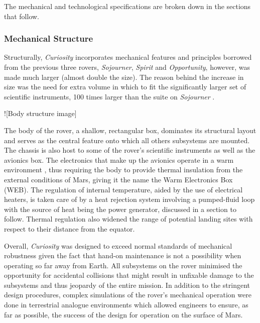       The mechanical and technological specifications are broken down in the sections that follow.
      
      \subsubsection{Mechanical Structure}
        Structurally, \textit{Curiosity} incorporates mechanical features and principles borrowed from the previous three rovers, \textit{Sojourner}, \textit{Spirit} and \textit{Opportunity}, however, was made much larger (almost double the size). The reason behind the increase in size was the need for extra volume in which to fit the significantly larger set of scientific instruments, 100 times larger than the suite on \textit{Sojourner} \cite{planetary2011}.
        
        ![Body structure image]
        
        The body of the rover, a shallow, rectangular box, dominates its structural layout and serves as the central feature onto which all others subsystems are mounted. The chassis is also host to some of the rover's scientific instruments as well as the avionics box. The electronics that make up the avionics operate in a warm environment \cite{nasajulypresskit}, thus requiring the body to provide thermal insulation from the external conditions of Mars, giving it the name the Warm Electronics Box (WEB). The regulation of internal temperature, aided by the use of electrical heaters, is taken care of by a heat rejection system involving a pumped-fluid loop with the source of heat being the power generator, discussed in a section to follow. Thermal regulation also widened the range of potential landing sites with respect to their distance from the equator.
        
        Overall, \textit{Curiosity} was designed to exceed normal standards of mechanical robustness given the fact that hand-on maintenance is not a possibility when operating so far away from Earth. All subsystems on the rover minimised the opportunity for accidental collisions that might result in unfixable damage to the subsystems and thus jeopardy of the entire mission. In addition to the stringent design procedures, complex simulations of the rover's mechanical operation were done in terrestrial analogue environments which allowed engineers to ensure, as far as possible, the success of the design for operation on the surface of Mars.
        
